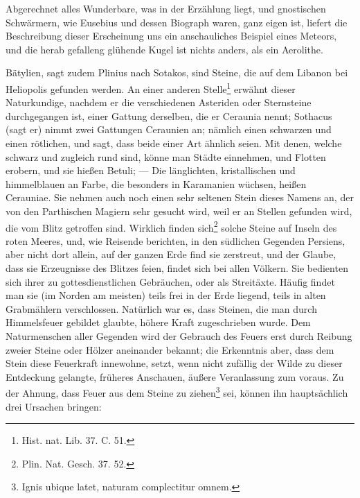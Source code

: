 \documentclass[a4paper, 11pt, oneside, polutonikogreek, german]{article}
\begin{document}
Abgerechnet alles Wunderbare, was in der Erzählung liegt, und gnostischen Schwärmern, wie Eusebius und dessen Biograph waren, ganz eigen ist, liefert die Beschreibung dieser Erscheinung uns ein anschauliches Beispiel eines Meteors, und die herab gefalleng glühende Kugel ist nichts anders, als ein Aerolithe.

Bätylien, sagt zudem Plinius nach Sotakos, sind Steine, die auf dem Libanon bei Heliopolis gefunden werden. An einer anderen Stelle\footnote{Hist. nat. Lib. 37. C. 51.} erwähnt dieser Naturkundige, nachdem er die verschiedenen Asteriden oder Sternsteine durchgegangen ist, einer Gattung derselben, die er Ceraunia nennt; Sothacus (sagt er) nimmt zwei Gattungen Ceraunien an; nämlich einen schwarzen und einen rötlichen, und sagt, dass beide einer Art ähnlich seien. Mit denen, welche schwarz und zugleich rund sind, könne man Städte einnehmen, und Flotten erobern, und sie hießen Betuli; --- Die länglichten, kristallischen und himmelblauen an Farbe, die besonders in Karamanien wüchsen, heißen Cerauniae. Sie nehmen auch noch einen sehr seltenen Stein dieses Namens an, der von den Parthischen Magiern sehr gesucht wird, weil er an Stellen gefunden wird, die vom Blitz getroffen sind. Wirklich finden sich\footnote{Plin. Nat. Gesch. 37. 52.} solche Steine auf Inseln des roten Meeres, und, wie Reisende berichten, in den südlichen Gegenden Persiens, aber nicht dort allein, auf der ganzen Erde find sie zerstreut, und der Glaube, dass sie Erzeugnisse des Blitzes feien, findet sich bei allen Völkern. Sie bedienten sich ihrer zu gottesdienstlichen Gebräuchen, oder als Streitäxte. Häufig findet man sie (im Norden am meisten) teils frei in der Erde liegend, teils in alten Grabmählern verschlossen. Natürlich war es, dass Steinen, die man durch Himmelsfeuer gebildet glaubte, höhere Kraft zugeschrieben wurde. Dem Naturmenschen aller Gegenden wird der Gebrauch des Feuers erst durch Reibung zweier Steine oder Hölzer aneinander bekannt; die Erkenntnis aber, dass dem Stein diese Feuerkraft innewohne, setzt, wenn nicht zufällig der Wilde zu dieser Entdeckung gelangte, früheres Anschauen, äußere Veranlassung zum voraus. Zu der Ahnung, dass Feuer aus dem Steine zu ziehen\footnote{Ignis ubique latet, naturam complectitur omnem.} sei, können ihn hauptsächlich drei Ursachen bringen:
\end{document}
